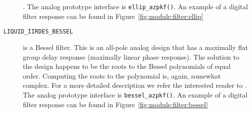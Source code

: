 \begin{description}
    \cite{Orfanidis:2006}.
    The analog prototype interface is {\tt ellip\_azpkf()}.
    An example of a digital filter response can be found in
    Figure~\ref{fig:module:filter:ellip}
\item[{\tt LIQUID\_IIRDES\_BESSEL}]
    is a Bessel filter.
    This is an all-pole analog design that has a maximally flat group delay
    response (maximally linear phase response).
    The solution to the design happens to be the roots to the Bessel
    polynomials of equal order.
    Computing the roots to the polynomial is, again, somewhat complex.
    For a more detailed description we refer the interested reader to
    \cite{Orchard:1965}.
    The analog prototype interface is {\tt bessel\_azpkf()}.
    An example of a digital filter response can be found in
    Figure~\ref{fig:module:filter:bessel}
\end{description}

% 
%
